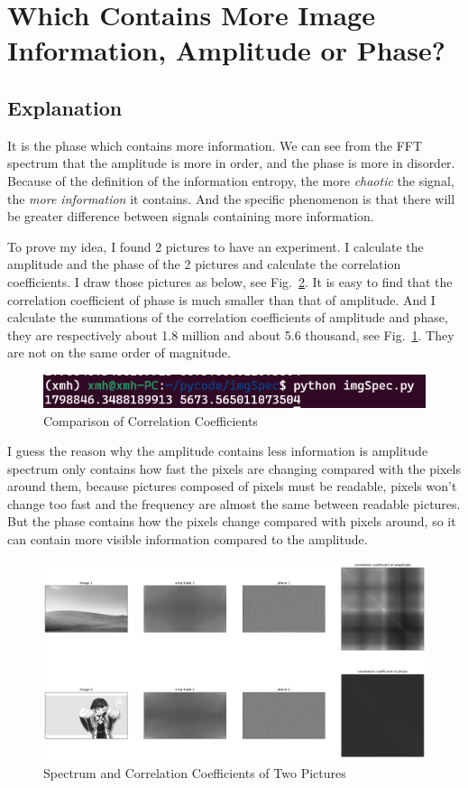 \documentclass{article}
\begin{document}
\section{Which Contains More Image Information, Amplitude or Phase?}
\subsection{Explanation}
It is the phase which contains more information. We can see from the FFT spectrum that the amplitude is more in order, and the phase is more in disorder. Because of the definition of the information entropy, the more \emph{chaotic} the signal, the \emph{more information} it contains. And the specific phenomenon is that there will be greater difference between signals containing more information.



To prove my idea, I found 2 pictures to have an experiment. I calculate the amplitude and the phase of the 2 pictures and calculate the correlation coefficients. I draw those pictures as below, see Fig.~\ref{fig:imgSpec}. It is easy to find that the correlation coefficient of phase is much smaller than that of amplitude. And I calculate the summations of the correlation coefficients of amplitude and phase, they are respectively about 1.8 million and about 5.6 thousand, see Fig.~\ref{fig:corrcoef}. They are not on the same order of magnitude.

\begin{figure}[!h]
	\centering
	\includegraphics[width=3 in]{../pic/corrcoef.png}
	\caption{Comparison of Correlation Coefficients}
	\label{fig:corrcoef}
\end{figure}

I guess the reason why the amplitude contains less information is amplitude spectrum only contains how fast the pixels are changing compared with the pixels around them, because pictures composed of pixels must be readable, pixels won't change too fast and the frequency are almost the same between readable pictures. But the phase contains how the pixels change compared with pixels around, so it can contain more visible information compared to the amplitude.

\begin{figure}[!h]
	\centering
	\includegraphics[width=6 in]{../pic/imgSpec.png}
	\caption{Spectrum and Correlation Coefficients of Two Pictures}
	\label{fig:imgSpec}
\end{figure}
\end{document}
